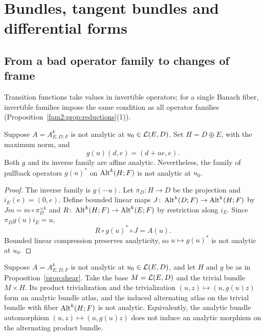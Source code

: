 \section{Bundles, tangent bundles and differential forms}\label{sec:geometry}

\subsection{From a bad operator family to changes of frame}

Transition functions take values in invertible operators; for a single Banach fiber, invertible families impose the same condition as all operator families (Proposition~\ref{fam2:prop:reductions}(1)).

\begin{proposition}\label{prop:shear}
Suppose $A=A^k_{E,D;F}$ is not analytic at $u_0\in\mathcal L(E,D)$. Set $H=D\oplus E$, with the maximum norm, and
\[
 g(u)(d,e)=(d+ue,e).
\]
Both $g$ and its inverse family are affine analytic. Nevertheless, the family of pullback operators $g(u)^*$ on $\operatorname{Alt}^k(H;F)$ is not analytic at $u_0$.
\end{proposition}

\begin{proof}
The inverse family is $g(-u)$. Let $\pi_D\colon H\to D$ be the projection and $i_E(e)=(0,e)$. Define bounded linear maps $J\colon\operatorname{Alt}^k(D;F)\to\operatorname{Alt}^k(H;F)$ by $Jm=m\circ\pi_D^{\times k}$ and $R\colon\operatorname{Alt}^k(H;F)\to\operatorname{Alt}^k(E;F)$ by restriction along $i_E$. Since $\pi_Dg(u)i_E=u$,
\begin{equation}\label{eq:shear-compression}
 R\circ g(u)^*\circ J=A(u).
\end{equation}
Bounded linear compression preserves analyticity, so $u\mapsto g(u)^*$ is not analytic at $u_0$.
\end{proof}

\begin{corollary}\label{cor:shear-bundle}
Suppose $A=A^k_{E,D;F}$ is not analytic at $u_0\in\mathcal L(E,D)$, and let $H$ and $g$ be as in Proposition~\ref{prop:shear}. Take the base $M=\mathcal L(E,D)$ and the trivial bundle $M\times H$. Its product trivialization and the trivialization $(u,z)\mapsto(u,g(u)z)$ form an analytic bundle atlas, and the induced alternating atlas on the trivial bundle with fiber $\operatorname{Alt}^k(H;F)$ is not analytic. Equivalently, the analytic bundle automorphism $(u,z)\mapsto(u,g(u)z)$ does not induce an analytic morphism on the alternating product bundle.
\end{corollary}

